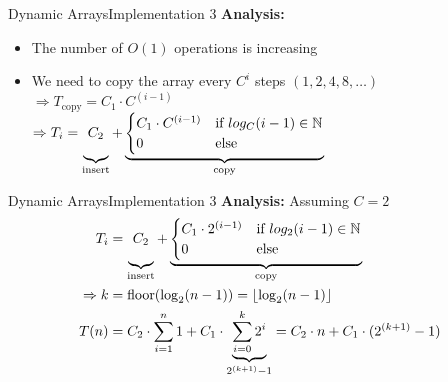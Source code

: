 
\begin{frame}{Dynamic Arrays}{Implementation 3}
  \textbf{Analysis:}
  \begin{itemize}
    \item
      The number of $O(1)$ operations is increasing
    \item
      We need to copy the array every $C^i$ steps $(1, 2, 4, 8,\dots)$\\[0.5em]
      $\Rightarrow T_\text{copy} = C_1 \cdot C^{(i-1)}$\\
      $\Rightarrow T_i
        = \underbrace{
            C_2\vphantom{\begin{cases}C_1\\0\end{cases}}
          }_\text{insert}
          + \underbrace{\begin{cases}
            C_1 \cdot C^{(i-1)} & \text{if } log_C(i-1) \in \mathbb{N}\\
            0 & \text{else}
          \end{cases}}_\text{copy}$
  \end{itemize}
\end{frame}


\begin{frame}{Dynamic Arrays}{Implementation 3}
  \textbf{Analysis:}
  Assuming $C = 2$
  \begin{align*}
    T_i
      &= \underbrace{
        C_2\vphantom{\begin{cases}C_1\\0\end{cases}}
      }_\text{insert}
      + \underbrace{\begin{cases}
        C_1 \cdot 2^{(i-1)} & \text{if } log_2(i-1) \in \mathbb{N}\\
        0 & \text{else}
        \end{cases}}_\text{copy}\\
    \Rightarrow k &= \mathrm{floor}(\log_2(n-1))
      = \left\lfloor\log_2(n-1)\right\rfloor\\
    T(n) &= C_2 \cdot \sum_{i=1}^{n} 1
        + C_1 \cdot \underbrace{\sum_{i=0}^{k} 2^i}_{2^{(k+1)}-1}
      = C_2 \cdot n + C_1 \cdot (2^{(k+1)}-1)
  \end{align*}
\end{frame}

